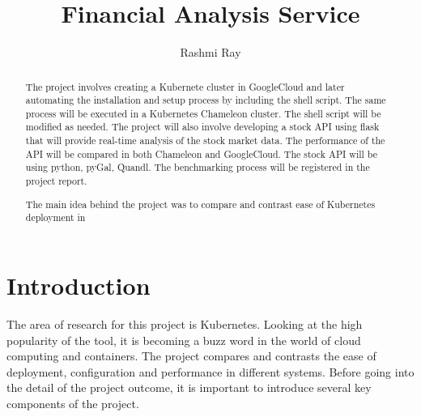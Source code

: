 
\title{Financial Analysis Service}

\author{Rashmi Ray}

\renewcommand{\shortauthors}{Uma Kugan}

\begin{abstract}
The project involves creating a Kubernete cluster in GoogleCloud and later 
automating the installation and setup process by including the shell script.
The same process will be executed in a Kubernetes Chameleon cluster. The shell
script will be modified as needed. The project will also involve developing a 
stock API using flask that will provide real-time analysis of the stock market 
data. The performance of the API will be compared in both Chameleon and 
GoogleCloud. The stock API will be using python, pyGal, Quandl. The 
benchmarking process will be registered in the project report. 

The main idea behind the project was to compare and contrast ease of 
Kubernetes deployment in 

\end{abstract}



\maketitle

\section{Introduction}

The area of research for this project is Kubernetes. Looking at the high
 popularity of the tool, it is becoming a buzz word in the world of cloud 
 computing and containers. The project compares and contrasts the ease of
  deployment, configuration and performance in different systems. Before going 
  into the detail of the project outcome, it is important to introduce several
   key components of the project.

